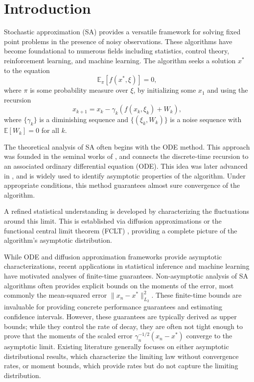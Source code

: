 \documentclass[11pt]{article}
\begin{document}
\section{Introduction}
Stochastic approximation (SA) provides a versatile framework for solving fixed point problems in the presence of noisy observations. 
These algorithms have become foundational to numerous fields including statistics, control theory, reinforcement learning, and machine learning. 
The algorithm seeks a solution $x^*$ to the equation
\begin{equation}\label{eq:sa_objective}
    \mathbb{E}_\pi \left[ f (x^*, \xi)\right]  = 0 , 
\end{equation}
where $\pi$ is some probability measure over $\xi$, by initializing some $x_1$ and using the recursion
\begin{equation}\label{eq:sa}
    x_{k+1} = x_k - \gamma_k (f(x_k, \xi_k) + W_{k})  ,
\end{equation}
where $\{\gamma_k\}$ is a diminishing \stepsize sequence and $\{(\xi_k, W_{k})\}$ is a noise sequence with $\mathbb{E}[W_{k}] = 0$ for all $k$. 




The theoretical analysis of SA often begins with the ODE method.
This approach was founded in the seminal works of \citep{meerkov1972simplified,derevitskii1974two,ljung1977analysis,kushner1978stochastic}, and connects the discrete-time recursion to an associated ordinary differential equation (ODE).
This idea was later advanced in \citep{borkar2000ode,borkar2008stochastic,borkar25}, and is widely used to identify asymptotic properties of the algorithm. 
Under appropriate conditions, this method guarantees almost sure convergence of the algorithm. 


A refined statistical understanding is developed by characterizing the fluctuations around this limit.
This is established via diffusion approximations \citep{kushner_yin} or the functional central limit theorem (FCLT) \citep{borkar25}, providing a complete picture of the algorithm's asymptotic distribution.


While ODE and diffusion approximation frameworks provide asymptotic characterizations, recent applications in statistical inference and machine learning have motivated analyses of finite-time guarantees. 
Non-asymptotic analysis of SA algorithms often provides explicit bounds on the moments of the error, most commonly the mean-squared error $\lVert x_n - x^* \rVert^2_{L_2}$. 
These finite-time bounds are invaluable for providing concrete performance guarantees and estimating confidence intervals. 
However, these guarantees are typically derived as upper bounds; while they control the rate of decay, they are often not tight enough to prove that the moments of the scaled error $\gamma_n^{-1/2}(x_n - x^*)$ converge to the asymptotic limit.
Existing literature generally focuses on either asymptotic distributional results, which characterize the limiting law without convergence rates, or \nonasymptotic moment bounds, which provide rates but do not capture the limiting distribution. 
\end{document}
